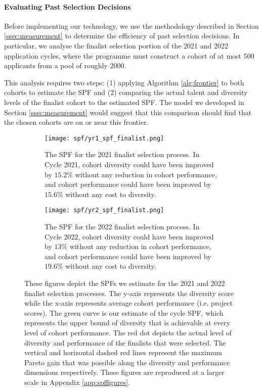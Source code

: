 \paragraph{Evaluating Past Selection Decisions} Before implementing our technology, we use the methodology described in Section \ref{ssec:measurement} to determine the efficiency of past selection decisions. In particular, we analyse the finalist selection portion of the 2021 and 2022 application cycles, where the programme must construct a cohort of at most $500$ applicants from a pool of roughly $2000$. 

This analysis requires two steps: (1) applying Algorithm \ref{alg:frontier} to both cohorts to estimate the SPF and (2) comparing the actual talent and diversity levels of the finalist cohort to the estimated SPF. The model we developed in Section \ref{ssec:measurement} would suggest that this comparison should find that the chosen cohorts are on or near this frontier. 

\begin{figure}[htbp]
    \centering
    \begin{subfigure}[b]{0.4\textwidth}
        \texttt{[image: spf/yr1\_spf\_finalist.png]}
        \caption{The SPF for the 2021 finalist selection process. In Cycle 2021, cohort diversity could have been improved by $15.2\%$ without any reduction in cohort performance, and cohort performance could have been improved by $15.6\%$ without any cost to diversity.}
        \label{fig:spf_2021}
    \end{subfigure}
    \hfill
    \begin{subfigure}[b]{0.4\textwidth}
        \texttt{[image: spf/yr2\_spf\_finalist.png]}
        \caption{The SPF for the 2022 finalist selection process. In Cycle 2022, cohort diversity could have been improved by $13\%$ without any reduction in cohort performance, and cohort performance could have been improved by $19.6\%$ without any cost to diversity.}
        \label{fig:spf_2022}
    \end{subfigure}
    \caption{These figures depict the SPFs we estimate for the 2021 and 2022 finalist selection processes. The y-axis represents the diversity score while the x-axis represents average cohort performance (i.e. project scores). The green curve is our estimate of the cycle SPF, which represents the upper bound of diversity that is achievable at every level of cohort performance. The red dot depicts the actual level of diversity and performance of the finalists that were selected. The vertical and horizontal dashed red lines represent the maximum Pareto gain that was possible along the diversity and performance dimensions respectively. These figures are reproduced at a larger scale in Appendix \ref{app:spffigures}.}
    \label{fig:spf_2021_2022}
\end{figure}

